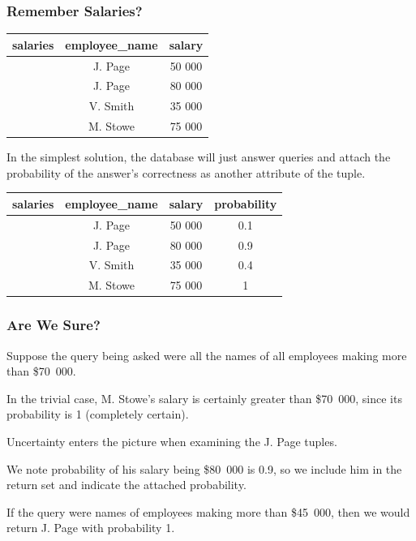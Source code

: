 \begin{frame}
\frametitle{Remember Salaries?}

\begin{table}[h]\begin{center}
        \begin{tabular}{r | c  c} 
					salaries & employee\_name & salary \\ \hline
	           		 & J. Page  & 50 000 \\ 
	         		 & J. Page  & 80 000 \\ 
					 & V. Smith & 35 000 \\ 
					 & M. Stowe & 75 000 \\ 
        \end{tabular}
\end{center}\end{table}

 In the simplest solution, the database will just answer queries and attach the probability of the answer's correctness as another attribute of the tuple.

\begin{table}[h]\begin{center}
        \begin{tabular}{r | c  c  c} 
					salaries & employee\_name & salary & probability\\ \hline
	           		 & J. Page  & 50 000 & 0.1 \\ 
	         		 & J. Page  & 80 000 & 0.9 \\ 
					 & V. Smith & 35 000 & 0.4 \\ 
					 & M. Stowe & 75 000 & 1 \\ 
        \end{tabular}
\end{center}\end{table}


\end{frame}


\begin{frame}
\frametitle{Are We Sure?}

Suppose the query being asked were all the names of all employees making more than \$70~000. 

In the trivial case, M. Stowe's salary is certainly greater than \$70~000, since its probability is 1 (completely certain). 

Uncertainty enters the picture when examining the J. Page tuples. 

We note probability of his salary being \$80~000 is 0.9, so we include him in the return set and indicate the attached probability.

If the query were names of employees making more than \$45~000, then we would return J. Page with probability 1.

\end{frame}


